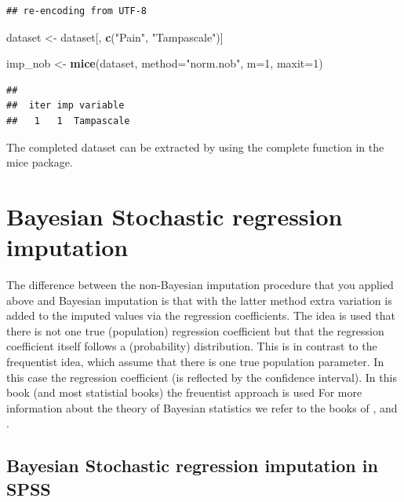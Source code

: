 \documentclass[]{book}
\newenvironment{Shaded}{\begin{snugshade}}{\end{snugshade}}
\newcommand{\KeywordTok}[1]{\textcolor[rgb]{0.13,0.29,0.53}{\textbf{#1}}}
\newcommand{\DataTypeTok}[1]{\textcolor[rgb]{0.13,0.29,0.53}{#1}}
\newcommand{\DecValTok}[1]{\textcolor[rgb]{0.00,0.00,0.81}{#1}}
\newcommand{\StringTok}[1]{\textcolor[rgb]{0.31,0.60,0.02}{#1}}
\newcommand{\NormalTok}[1]{#1}
\theoremstyle{definition}
\theoremstyle{definition}
\theoremstyle{definition}
\theoremstyle{remark}
\begin{document}
\begin{verbatim}
## re-encoding from UTF-8
\end{verbatim}

\begin{Shaded}
\begin{Highlighting}[]
\NormalTok{dataset <-}\StringTok{ }\NormalTok{dataset[, }\KeywordTok{c}\NormalTok{(}\StringTok{"Pain"}\NormalTok{, }\StringTok{"Tampascale"}\NormalTok{)]}

\NormalTok{imp_nob <-}\StringTok{ }\KeywordTok{mice}\NormalTok{(dataset, }\DataTypeTok{method=}\StringTok{"norm.nob"}\NormalTok{, }\DataTypeTok{m=}\DecValTok{1}\NormalTok{, }\DataTypeTok{maxit=}\DecValTok{1}\NormalTok{)}
\end{Highlighting}
\end{Shaded}

\begin{verbatim}
## 
##  iter imp variable
##   1   1  Tampascale
\end{verbatim}

The completed dataset can be extracted by using the complete function in
the mice package.

\section{Bayesian Stochastic regression
imputation}\label{bayesian-stochastic-regression-imputation}

The difference between the non-Bayesian imputation procedure that you
applied above and Bayesian imputation is that with the latter method
extra variation is added to the imputed values via the regression
coefficients. The idea is used that there is not one true (population)
regression coefficient but that the regression coefficient itself
follows a (probability) distribution. This is in contrast to the
frequentist idea, which assume that there is one true population
parameter. In this case the regression coefficient (is reflected by the
confidence interval). In this book (and most statistial books) the
freuentist approach is used For more information about the theory of
Bayesian statistics we refer to the books of
\citet{box2007bayesianinferencein}, \citet{enders2010applied} and
\citet{gelman2014bayesian}.

\subsection{Bayesian Stochastic regression imputation in
SPSS}\label{bayesian-stochastic-regression-imputation-in-spss}
\end{document}
